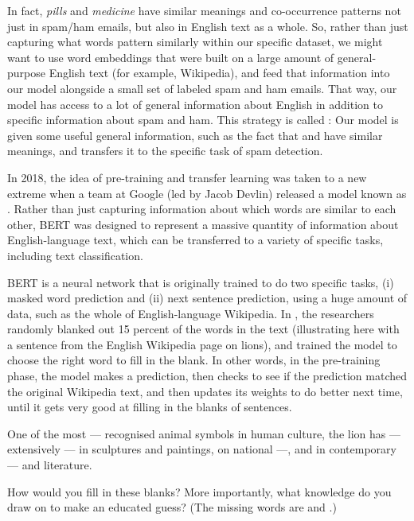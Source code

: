 In fact,  \textit{pills} and \textit{medicine} have similar meanings and co-occurrence patterns not just in  spam/ham emails, but also in English text as a whole.  So, rather than just capturing what words pattern similarly within our specific dataset, we might want to use  word embeddings that were built on a large amount of general-purpose English text (for example, Wikipedia), and feed that information into our model alongside a small set of labeled spam and ham emails.  That way, our model has access to a lot of general information about English in addition to specific information about spam and ham.  This strategy is called : Our model is given some useful general information, such as the fact that  and  have similar meanings, and transfers it to the specific task of spam detection. 


In 2018, the idea of pre-training and transfer learning was taken to a new extreme when a team at Google (led by Jacob Devlin) released a model known as  \citep{Devlin-etal:2019}.  Rather than just capturing information about which words are similar to each other, BERT was designed to represent a massive quantity of information about English-language text, which can be transferred to a variety of specific tasks, including text classification. 

BERT is a neural network that is originally trained to do two specific tasks, (i) masked word prediction and (ii) next sentence prediction, using a huge amount of data, such as the whole of English-language Wikipedia.  In , the researchers randomly blanked out 15 percent of the words in the text (illustrating here with a sentence from the English Wikipedia page on lions), and trained the model to choose the right word to fill in the blank.  In other words, in the pre-training phase, the model makes a prediction, then checks to see if the prediction matched the original Wikipedia text, and then updates its weights to do better next time, until it gets very good at filling in the blanks of sentences.

\ea  One of the most --- recognised animal symbols in human culture, the lion has --- extensively --- in sculptures and paintings, on national ---, and in contemporary --- and literature.
\z


How would you fill in these blanks?  More importantly, what knowledge do you draw on to make an educated guess?  (The missing words are  and .)


